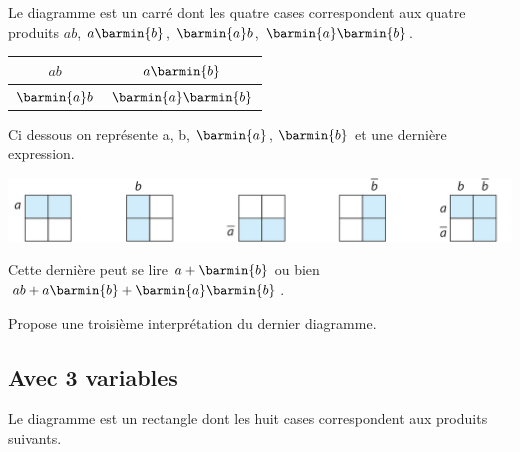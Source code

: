 Le diagramme est un carré dont les quatre cases correspondent aux quatre produits $ab$, $a\barmin{b}$, $\barmin{a}b$, $\barmin{a}\barmin{b}$.

\begin{center}
    \begin{tabular}{|c|c|}
        \hline
        $ab$          & $a\barmin{b}$          \\
        \hline
        $\barmin{a}b$ & $\barmin{a}\barmin{b}$ \\
        \hline
    \end{tabular}
\end{center}
Ci dessous on représente a, b, $\barmin{a}$, $\barmin{b}$ et une dernière expression.
\begin{center}
    \includegraphics[width=\linewidth]{boole/img/karnaugh1.png}
\end{center}

Cette dernière peut se lire $a+\barmin{b}$ ou bien $ab+a\barmin{b}+\barmin{a}\barmin{b}$.

\begin{exercice}[]
    Propose une troisième interprétation du dernier diagramme.
\end{exercice}

\subsection{Avec 3 variables}

Le diagramme est un rectangle dont les huit cases correspondent aux produits suivants.


